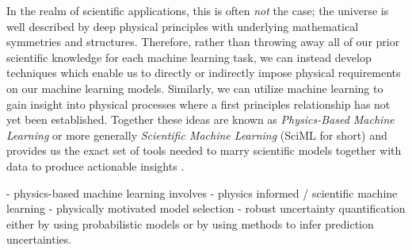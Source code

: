 In the realm of scientific applications, this is often \textit{not} the case;
the universe is well described by deep physical principles with underlying
mathematical symmetries and structures. Therefore, rather than throwing away all
of our prior scientific knowledge for each machine learning task, we can instead
develop techniques which enable us to directly or indirectly impose physical
requirements on our machine learning models. Similarly, we can utilize machine
learning to gain insight into physical processes where a first principles
relationship has not yet been established. Together these ideas are known as
\textit{Physics-Based Machine Learning} or more generally \textit{Scientific
  Machine Learning} (SciML for short) and provides us the exact set of tools
needed to marry scientific models together with data to produce actionable
insights \cite{rackauckas2020universal}.

- physics-based machine learning involves
  - physics informed / scientific machine learning
  - physically motivated model selection
  - robust uncertainty quantification either by using probabilistic models or by
  using methods to infer prediction uncertainties.










